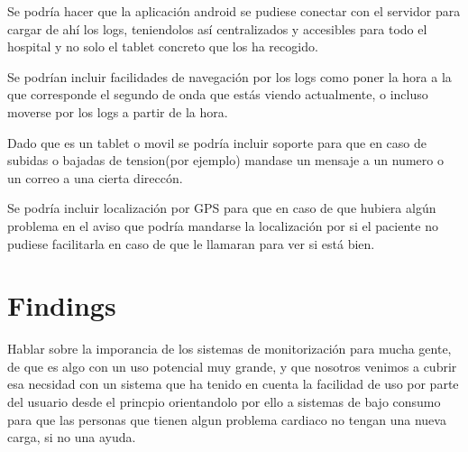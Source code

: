 		Se podría hacer que la aplicación android se pudiese conectar con el servidor para cargar de ahí los logs, teniendolos así centralizados y accesibles para todo el hospital y no solo el tablet concreto que los ha recogido.

		Se podrían incluir facilidades de navegación por los logs como poner la hora a la que corresponde el segundo de onda que estás viendo actualmente, o incluso moverse por los logs a partir de la hora.

		Dado que es un tablet o movil se podría incluir soporte para que en caso de subidas o bajadas de tension(por ejemplo) mandase un mensaje a un numero o un correo a una cierta direccón.

		Se podría incluir localización por GPS para que en caso de que hubiera algún problema en el aviso que podría mandarse la localización por si el paciente no pudiese facilitarla en caso de que le llamaran para ver si está bien.
	
	\section{Findings}

	Hablar sobre la imporancia de los sistemas de monitorización para mucha gente, de que es algo con un uso potencial muy grande, y que nosotros venimos a cubrir esa necsidad con un sistema que ha tenido en cuenta la facilidad de uso por parte del usuario desde el princpio orientandolo por ello a sistemas de bajo consumo para que las personas que tienen algun problema cardiaco no tengan una nueva carga, si no una ayuda.